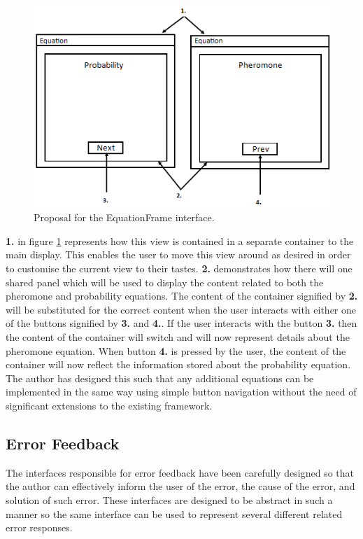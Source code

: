 \begin{figure}[H]
\centering
\includegraphics[scale=0.7]{Images/chapter4/pheroprobpanels}
\caption[EquationFrame Design]{Proposal for the EquationFrame interface.}
\label{fig:eqnViewImp}
\end{figure}

\textbf{1.} in figure \ref{fig:eqnViewImp} represents how this view is contained in a separate container to the main display. This enables the user to move this view around as desired in order to customise the current view to their tastes. \textbf{2.} demonstrates how there will one shared panel which will be used to display the content related to both the pheromone and probability equations. The content of the container signified by \textbf{2.} will be substituted for the correct content when the user interacts with either one of the buttons signified by \textbf{3.} and \textbf{4.}. If the user interacts with the button \textbf{3.} then the content of the container will switch and will now represent details about the pheromone equation. When button \textbf{4.} is pressed by the user, the content of the container will now reflect the information stored about the probability equation. The author has designed this such that any additional equations can be implemented in the same way using simple button navigation without the need of significant extensions to the existing framework.

\subsection{Error Feedback}
The interfaces responsible for error feedback have been carefully designed so that the author can effectively inform the user of the error, the cause of the error, and solution of such error. These interfaces are designed to be abstract in such a manner so the same interface can be used to represent several different related error responses.

